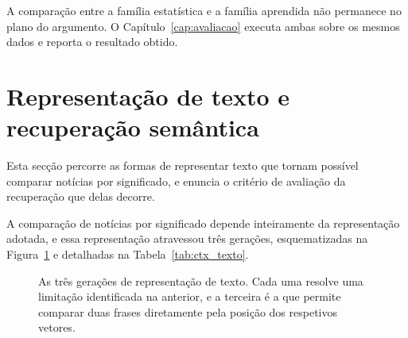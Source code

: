A comparação entre a família estatística e a família aprendida não permanece no plano do argumento.
O Capítulo~\ref{cap:avaliacao} executa ambas sobre os mesmos dados e reporta o resultado obtido.

\section{Representação de texto e recuperação semântica}
\label{sec:ctx_texto}

Esta secção percorre as formas de representar texto que tornam possível comparar notícias por
significado, e enuncia o critério de avaliação da recuperação que delas decorre.

A comparação de notícias por significado depende inteiramente da representação adotada, e essa
representação atravessou três gerações, esquematizadas na Figura~\ref{fig:ctx_geracoes} e
detalhadas na Tabela~\ref{tab:ctx_texto}.

\begin{figure}[ht]
\centering
{}
\caption[Três gerações de representação de texto]{As três gerações de representação de texto. Cada
uma resolve uma limitação identificada na anterior, e a terceira é a que permite comparar duas
frases diretamente pela posição dos respetivos vetores.}
\label{fig:ctx_geracoes}
\end{figure}

